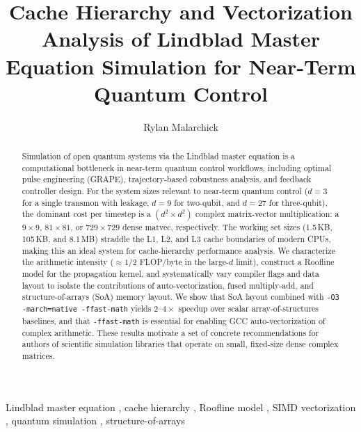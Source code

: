 \documentclass[final,3p,times,twocolumn]{elsarticle}
\begin{document}
\begin{frontmatter}

\title{Cache Hierarchy and Vectorization Analysis of Lindblad Master Equation
       Simulation for Near-Term Quantum Control}

\author[erau]{Rylan Malarchick}


\begin{abstract}
Simulation of open quantum systems via the Lindblad master equation is a
computational bottleneck in near-term quantum control workflows, including
optimal pulse engineering (GRAPE), trajectory-based robustness analysis, and
feedback controller design.
%
For the system sizes relevant to near-term quantum control ($d = 3$
for a single transmon with leakage, $d = 9$ for two-qubit, and $d = 27$
for three-qubit), the dominant cost per timestep is a $(d^2 \times d^2)$
complex matrix-vector multiplication: a $9\times9$, $81\times81$, or
$729\times729$ dense matvec, respectively.
%
The working set sizes (1.5\,KB, 105\,KB, and 8.1\,MB) straddle the
L1, L2, and L3 cache boundaries of modern CPUs, making this an ideal system
for cache-hierarchy performance analysis.
%
We characterize the arithmetic intensity ($\approx 1/2$ FLOP/byte in the
large-$d$ limit), construct a Roofline model for the propagation kernel,
and systematically vary compiler flags and data layout to isolate the
contributions of auto-vectorization, fused multiply-add, and
structure-of-arrays (SoA) memory layout.
%
We show that SoA layout combined with \texttt{-O3 -march=native -ffast-math}
yields $2$--$4\times$ speedup over scalar array-of-structures baselines, and
that \texttt{-ffast-math} is essential for enabling GCC auto-vectorization
of complex arithmetic.
%
These results motivate a set of concrete recommendations for authors of
scientific simulation libraries that operate on small, fixed-size dense
complex matrices.
\end{abstract}

\begin{keyword}
  Lindblad master equation \sep
  cache hierarchy \sep
  Roofline model \sep
  SIMD vectorization \sep
  quantum simulation \sep
  structure-of-arrays
\end{keyword}

\end{frontmatter}
\end{document}

